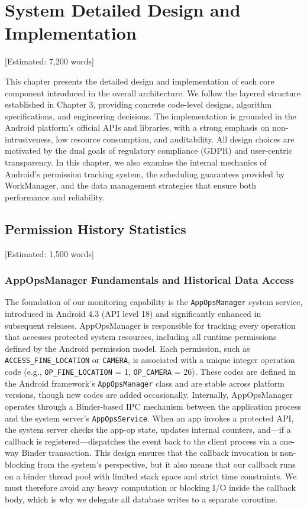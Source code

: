 \newpage\section{System Detailed Design and Implementation} [Estimated: 7,200 words]

This chapter presents the detailed design and implementation of each core component introduced in the overall architecture. We follow the layered structure established in Chapter 3, providing concrete code-level designs, algorithm specifications, and engineering decisions. The implementation is grounded in the Android platform's official APIs and libraries, with a strong emphasis on non-intrusiveness, low resource consumption, and auditability. All design choices are motivated by the dual goals of regulatory compliance (GDPR) and user-centric transparency. In this chapter, we also examine the internal mechanics of Android's permission tracking system, the scheduling guarantees provided by WorkManager, and the data management strategies that ensure both performance and reliability.

\subsection{Permission History Statistics} [Estimated: 1,500 words]

\subsubsection{AppOpsManager Fundamentals and Historical Data Access}

The foundation of our monitoring capability is the \texttt{AppOpsManager} system service, introduced in Android 4.3 (API level 18) and significantly enhanced in subsequent releases. AppOpsManager is responsible for tracking every operation that accesses protected system resources, including all runtime permissions defined by the Android permission model. Each permission, such as \texttt{ACCESS\_FINE\_LOCATION} or \texttt{CAMERA}, is associated with a unique integer operation code (e.g., \texttt{OP\_FINE\_LOCATION} = 1, \texttt{OP\_CAMERA} = 26). These codes are defined in the Android framework's \texttt{AppOpsManager} class and are stable across platform versions, though new codes are added occasionally. Internally, AppOpsManager operates through a Binder-based IPC mechanism between the application process and the system server's \texttt{AppOpsService}. When an app invokes a protected API, the system server checks the app-op state, updates internal counters, and—if a callback is registered—dispatches the event back to the client process via a one-way Binder transaction. This design ensures that the callback invocation is non-blocking from the system's perspective, but it also means that our callback runs on a binder thread pool with limited stack space and strict time constraints. We must therefore avoid any heavy computation or blocking I/O inside the callback body, which is why we delegate all database writes to a separate coroutine.

